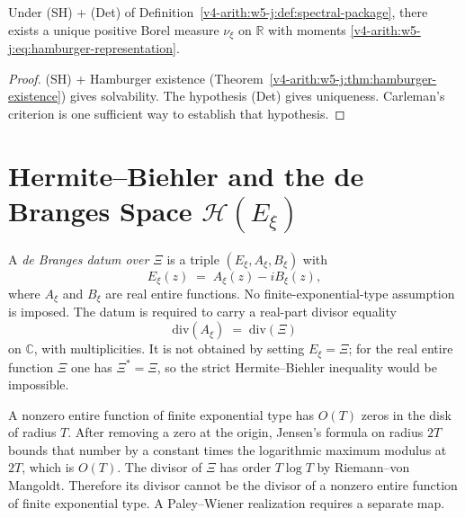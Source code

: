 \begin{corollary}
\label{v4-arith:w5-j:cor:unique-measure}
Under (SH) + (Det) of
Definition~\ref{v4-arith:w5-j:def:spectral-package}, there exists a unique
positive Borel measure \(\nu_{\xi}\) on \(\mathbb{R}\) with moments
\eqref{v4-arith:w5-j:eq:hamburger-representation}.
\end{corollary}

\begin{proof}
(SH) + Hamburger existence
(Theorem~\ref{v4-arith:w5-j:thm:hamburger-existence}) gives solvability.
The hypothesis (Det) gives uniqueness. Carleman's criterion is
one sufficient way to establish that hypothesis.
\end{proof}

\section{Hermite--Biehler and the de Branges Space \(\mathcal{H}(E_{\xi})\)}
\label{v4-arith:w5-j:HB-deBranges}

\begin{definition}
\label{v4-arith:w5-j:def:HB-decomposition}
A \emph{de Branges datum over \(\Xi\)} is a
triple \((E_{\xi},A_{\xi},B_{\xi})\) with
\begin{equation}
\label{v4-arith:w5-j:eq:HB-decomp}
E_{\xi}(z)\;=\;A_{\xi}(z)-iB_{\xi}(z),
\end{equation}
where \(A_{\xi}\) and \(B_{\xi}\) are real entire functions.
No finite-exponential-type assumption is imposed.  The datum is required to carry a real-part divisor equality
\[
\mathrm{div}(A_{\xi})\;=\;\mathrm{div}(\Xi)
\]
on \(\mathbb{C}\), with multiplicities.  It is not obtained by
setting \(E_{\xi}=\Xi\); for the real entire function \(\Xi\) one has
\(\Xi^{*}=\Xi\), so the strict Hermite--Biehler inequality would be
impossible.
\end{definition}

\begin{remark}
\label{v4-arith:w5-j:rem:Xi-divisor-growth}
A nonzero entire function of finite exponential type has \(O(T)\)
zeros in the disk of radius \(T\). After removing a zero at the
origin, Jensen's formula on radius \(2T\) bounds that number by a
constant times the logarithmic maximum modulus at \(2T\), which
is \(O(T)\). The divisor of \(\Xi\) has order \(T\log T\) by
Riemann--von Mangoldt. Therefore its divisor cannot be the divisor
of a nonzero entire function of finite exponential type.
A Paley--Wiener realization requires a separate map.
\end{remark}

